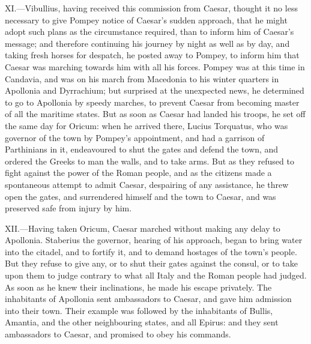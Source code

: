 XI.—Vibullius, having received this commission from Caesar, thought it
no less necessary to give Pompey notice of Caesar's sudden approach,
that he might adopt such plans as the circumstance required, than to
inform him of Caesar's message; and therefore continuing his journey by
night as well as by day, and taking fresh horses for despatch, he posted
away to Pompey, to inform him that Caesar was marching towards him with
all his forces. Pompey was at this time in Candavia, and was on his
march from Macedonia to his winter quarters in Apollonia and Dyrrachium;
but surprised at the unexpected news, he determined to go to Apollonia
by speedy marches, to prevent Caesar from becoming master of all the
maritime states. But as soon as Caesar had landed his troops, he set off
the same day for Oricum: when he arrived there, Lucius Torquatus, who
was governor of the town by Pompey's appointment, and had a garrison of
Parthinians in it, endeavoured to shut the gates and defend the town,
and ordered the Greeks to man the walls, and to take arms. But as they
refused to fight against the power of the Roman people, and as the
citizens made a spontaneous attempt to admit Caesar, despairing of any
assistance, he threw open the gates, and surrendered himself and the
town to Caesar, and was preserved safe from injury by him.

XII.—Having taken Oricum, Caesar marched without making any delay to
Apollonia. Staberius the governor, hearing of his approach, began to
bring water into the citadel, and to fortify it, and to demand hostages
of the town's people. But they refuse to give any, or to shut their
gates against the consul, or to take upon them to judge contrary to what
all Italy and the Roman people had judged. As soon as he knew their
inclinations, he made his escape privately. The inhabitants of Apollonia
sent ambassadors to Caesar, and gave him admission into their town.
Their example was followed by the inhabitants of Bullis, Amantia, and
the other neighbouring states, and all Epirus: and they sent ambassadors
to Caesar, and promised to obey his commands.

